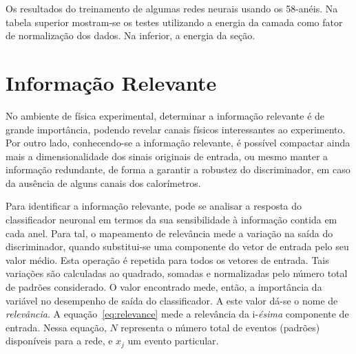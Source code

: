\renewcommand{\baselinestretch}{1}
\begin{table}
\caption[Os resultados do treinamento de algumas redes neurais usando os
58-anéis.]{Os resultados do treinamento de algumas redes neurais usando os
58-anéis. Na tabela superior mostram-se os testes utilizando a energia da
camada como fator de normalização dos dados. Na inferior, a energia da seção.}
\label{tab:layer-section}
\renewcommand{\baselinestretch}{1.5}
\small
\begin{center}
\begin{sideways}

\end{sideways}
\hspace{2cm}
\begin{sideways}

\end{sideways}
\end{center}
\end{table}
\renewcommand{\baselinestretch}{1.5}
\normalsize

\section{Informação Relevante}
\label{sec:relevance}

No ambiente de física experimental, determinar a informação relevante é de
grande importância, podendo revelar canais físicos interessantes ao
experimento. Por outro lado, conhecendo-se a informação relevante, é possível
compactar ainda mais a dimensionalidade dos sinais originais de entrada, ou
mesmo manter a informação redundante, de forma a garantir a robustez do
discriminador, em caso da ausência de alguns canais dos calorímetros.

Para identificar a informação relevante, pode se analisar a resposta do
classificador neuronal em termos da sua sensibilidade à informação contida em
cada anel. Para tal, o mapeamento de relevância \cite{relevance} mede a
variação na saída do discriminador, quando substitui-se uma componente do
vetor de entrada pelo seu valor médio. Esta operação é repetida para todos os
vetores de entrada. Tais variações são calculadas ao quadrado, somadas e
normalizadas pelo número total de padrões considerado. O valor encontrado
mede, então, a importância da variável no desempenho de saída do
classificador. A este valor dá-se o nome de \emph{relevância}. A
equação~\ref{eq:relevance} mede a relevância da i-\emph{ésima} componente de
entrada. Nessa equação, $N$ representa o número total de eventos (padrões)
disponíveis para a rede, e $x_j$ um evento particular.

